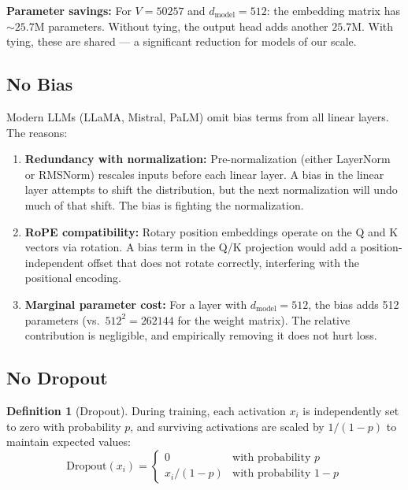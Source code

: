 \documentclass[11pt, a4paper]{article}
\theoremstyle{definition}
\newtheorem{definition}{Definition}[section]
\newcommand{\dmodel}{d_{\text{model}}}
\begin{document}
\textbf{Parameter savings:} For $V = 50257$ and $\dmodel = 512$: the embedding matrix has $\sim 25.7$M parameters. Without tying, the output head adds another $25.7$M. With tying, these are shared — a significant reduction for models of our scale.

\subsection{No Bias}

Modern LLMs (LLaMA, Mistral, PaLM) omit bias terms from all linear layers. The reasons:

\begin{enumerate}
    \item \textbf{Redundancy with normalization:} Pre-normalization (either LayerNorm or RMSNorm) rescales inputs before each linear layer. A bias in the linear layer attempts to shift the distribution, but the next normalization will undo much of that shift. The bias is fighting the normalization.
    
    \item \textbf{RoPE compatibility:} Rotary position embeddings operate on the Q and K vectors via rotation. A bias term in the Q/K projection would add a position-independent offset that does not rotate correctly, interfering with the positional encoding.
    
    \item \textbf{Marginal parameter cost:} For a layer with $\dmodel = 512$, the bias adds 512 parameters (vs.\ $512^2 = 262144$ for the weight matrix). The relative contribution is negligible, and empirically removing it does not hurt loss.
\end{enumerate}

\subsection{No Dropout}

\begin{definition}[Dropout]
During training, each activation $x_i$ is independently set to zero with probability $p$, and surviving activations are scaled by $1/(1-p)$ to maintain expected values:
\begin{equation}
    \text{Dropout}(x_i) = \begin{cases} 0 & \text{with probability } p \\ x_i / (1-p) & \text{with probability } 1-p \end{cases}
\end{equation}
\end{definition}
\end{document}
